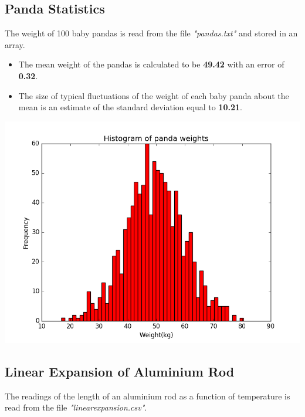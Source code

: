 \documentclass{extarticle}
\begin{document}
	\subsection{\color{MidnightBlue} Panda Statistics}
		The weight of 100 baby pandas is read from the file \emph{"pandas.txt"} and stored in an array.
		\begin{itemize}
		\item The mean weight of the pandas is calculated to be \textbf{49.42} with an error of 				\textbf{0.32}.
		\item The size of typical fluctuations of the weight of each baby panda about the mean is an estimate of the standard 				deviation equal to \textbf{10.21}.
		\end{itemize}
		\includegraphics[scale=0.75]{panda_hist}
	
		\newpage

	\subsection{\color{MidnightBlue} Linear Expansion of Aluminium Rod}
		The readings of the length of an aluminium rod as a function of temperature is read from the file
		\emph{"linearexpansion.csv"}.
		
\end{document}
